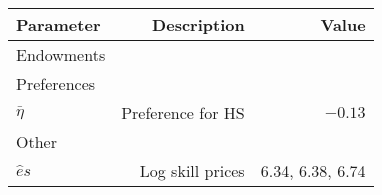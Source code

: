 \begin{tabular}{lrr}
\hline
Parameter & Description  & Value  \\ 
\hline
Endowments &   &   \\ 
Preferences &   &   \\ 
$\bar{\eta}$ & Preference for HS  & $-0.13$  \\ 
Other &   &   \\ 
$\hat{e}{s}$ & Log skill prices  & 6.34, 6.38, 6.74  \\ 
\hline
\end{tabular}%
